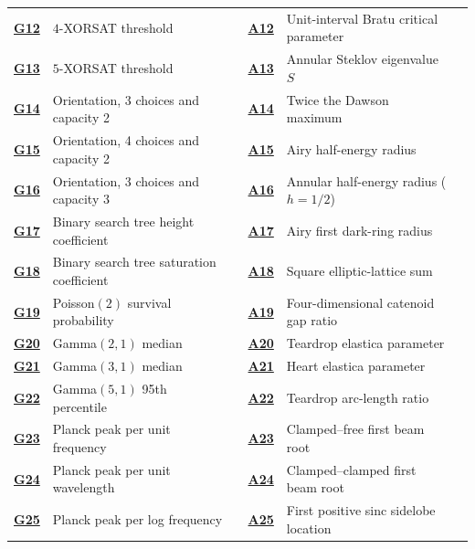 \documentclass[11pt,a4paper]{article}
\theoremstyle{definition}
\theoremstyle{remark}
\begin{document}
{\begin{tabularx}{\textwidth}{@{}l>{\raggedright\arraybackslash}Xrl>{\raggedright\arraybackslash}Xr@{}}
\hyperlink{cat-G12}{\textbf{G12}} & $4$-XORSAT threshold & \pageref*{page:G12} & \hyperlink{cat-A12}{\textbf{A12}} & Unit-interval Bratu critical parameter & \pageref*{page:A12} \\
\hyperlink{cat-G13}{\textbf{G13}} & $5$-XORSAT threshold & \pageref*{page:G13} & \hyperlink{cat-A13}{\textbf{A13}} & Annular Steklov eigenvalue $S$ & \pageref*{page:A13} \\
\hyperlink{cat-G14}{\textbf{G14}} & Orientation, 3 choices and capacity 2 & \pageref*{page:G14} & \hyperlink{cat-A14}{\textbf{A14}} & Twice the Dawson maximum & \pageref*{page:A14} \\
\hyperlink{cat-G15}{\textbf{G15}} & Orientation, 4 choices and capacity 2 & \pageref*{page:G15} & \hyperlink{cat-A15}{\textbf{A15}} & Airy half-energy radius & \pageref*{page:A15} \\
\hyperlink{cat-G16}{\textbf{G16}} & Orientation, 3 choices and capacity 3 & \pageref*{page:G16} & \hyperlink{cat-A16}{\textbf{A16}} & Annular half-energy radius ($h=1/2$) & \pageref*{page:A16} \\
\hyperlink{cat-G17}{\textbf{G17}} & Binary search tree height coefficient & \pageref*{page:G17} & \hyperlink{cat-A17}{\textbf{A17}} & Airy first dark-ring radius & \pageref*{page:A17} \\
\hyperlink{cat-G18}{\textbf{G18}} & Binary search tree saturation coefficient & \pageref*{page:G18} & \hyperlink{cat-A18}{\textbf{A18}} & Square elliptic-lattice sum & \pageref*{page:A18} \\
\hyperlink{cat-G19}{\textbf{G19}} & Poisson$(2)$ survival probability & \pageref*{page:G19} & \hyperlink{cat-A19}{\textbf{A19}} & Four-dimensional catenoid gap ratio & \pageref*{page:A19} \\
\hyperlink{cat-G20}{\textbf{G20}} & Gamma$(2,1)$ median & \pageref*{page:G20} & \hyperlink{cat-A20}{\textbf{A20}} & Teardrop elastica parameter & \pageref*{page:A20} \\
\hyperlink{cat-G21}{\textbf{G21}} & Gamma$(3,1)$ median & \pageref*{page:G21} & \hyperlink{cat-A21}{\textbf{A21}} & Heart elastica parameter & \pageref*{page:A21} \\
\hyperlink{cat-G22}{\textbf{G22}} & Gamma$(5,1)$ 95th percentile & \pageref*{page:G22} & \hyperlink{cat-A22}{\textbf{A22}} & Teardrop arc-length ratio & \pageref*{page:A22} \\
\hyperlink{cat-G23}{\textbf{G23}} & Planck peak per unit frequency & \pageref*{page:G23} & \hyperlink{cat-A23}{\textbf{A23}} & Clamped--free first beam root & \pageref*{page:A23} \\
\hyperlink{cat-G24}{\textbf{G24}} & Planck peak per unit wavelength & \pageref*{page:G24} & \hyperlink{cat-A24}{\textbf{A24}} & Clamped--clamped first beam root & \pageref*{page:A24} \\
\hyperlink{cat-G25}{\textbf{G25}} & Planck peak per log frequency & \pageref*{page:G25} & \hyperlink{cat-A25}{\textbf{A25}} & First positive sinc sidelobe location & \pageref*{page:A25} \\
\bottomrule\end{tabularx}}
\clearpage
\end{document}

